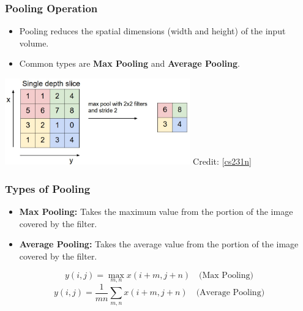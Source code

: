 \documentclass[aspectratio=169]{../latex_main/tntbeamer}  %
\begin{document}
    \begin{frame}
    \frametitle{Pooling Operation}
    \begin{itemize}
        \item Pooling reduces the spatial dimensions (width and height) of the input volume.
        \item Common types are \textbf{Max Pooling} and \textbf{Average Pooling}.
    \end{itemize}
        \centering
        \includegraphics[width=0.6\textwidth]{figure/maxpool.jpeg} Credit: [\href{https://cs231n.github.io/convolutional-networks/#overview}{cs231n}]
    \end{frame}
    
    \begin{frame}
    \frametitle{Types of Pooling}
    \begin{itemize}
        \item \textbf{Max Pooling:} Takes the maximum value from the portion of the image covered by the filter.
        \item \textbf{Average Pooling:} Takes the average value from the portion of the image covered by the filter.
    \end{itemize}
    \begin{equation}
        y(i,j) = \max_{m,n} x(i+m,j+n) \quad \text{(Max Pooling)}
    \end{equation}
    \begin{equation}
        y(i,j) = \frac{1}{mn}\sum_{m,n} x(i+m,j+n) \quad \text{(Average Pooling)}
    \end{equation}
    \end{frame}
    
\end{document}
